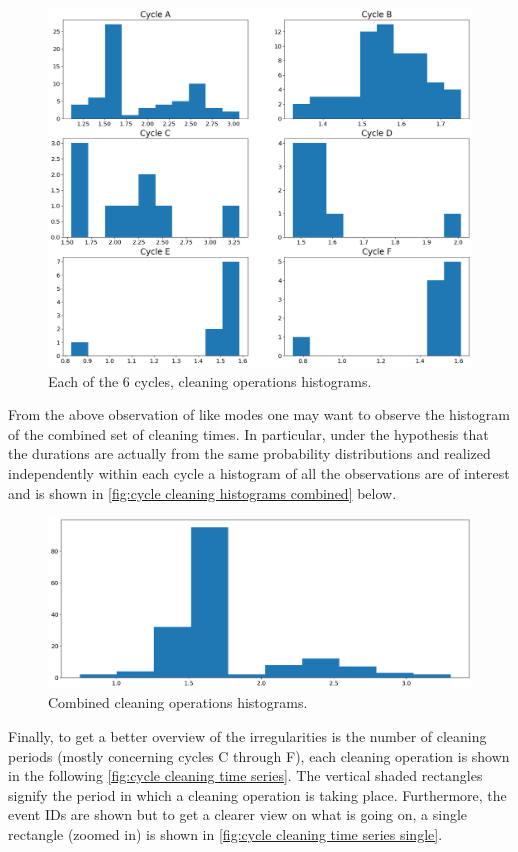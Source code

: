 \documentclass[../Thesis.tex]{subfiles}
\begin{document}
\begin{figure}[h]
    \centering
    \includegraphics[width=0.8\linewidth]{figures/Multiple cycles data/Cleaning batches histograms.png}
    \caption{Each of the 6 cycles, cleaning operations histograms.}
    \label{fig:cycle cleaning histograms}
\end{figure}

From the above observation of like modes one may want to observe the histogram of the combined set of cleaning times. In particular, under the hypothesis that the durations are actually from the same probability distributions and realized independently within each cycle a histogram of all the observations are of interest and is shown in \autoref{fig:cycle cleaning histograms combined} below.


\begin{figure}[H]
    \centering
    \includegraphics[width=0.8\linewidth]{figures/Multiple cycles data/Cleaning batches histograms combined.png}
    \caption{Combined cleaning operations histograms.}
    \label{fig:cycle cleaning histograms combined}
\end{figure}


Finally, to get a better overview of the irregularities is the number of cleaning periods (mostly concerning cycles C through F), each cleaning operation is shown in the following \autoref{fig:cycle cleaning time series}. The vertical shaded rectangles signify the period in which a cleaning operation is taking place. Furthermore, the event IDs are shown but to get a clearer view on what is going on, a single rectangle (zoomed in) is shown in \autoref{fig:cycle cleaning time series single}.
\end{document}
